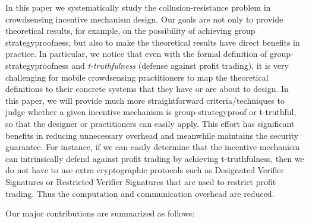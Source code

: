 \documentclass[conference]{IEEEtran}
\theoremstyle{definition}
\begin{document}

In this paper we systematically study the collusion-resistance problem in crowdsensing incentive mechanism design. Our goals are not only to provide theoretical results, for example, on the possibility of achieving group strategyproofness, but also to make the theoretical results have direct benefits in practice. In particular, we notice that even with the formal definition of group-strategyproofness and \textit{t-truthfulness} (defense against profit trading), it is very challenging for mobile crowdsensing practitioners to map the theoretical definitions to their concrete systems that they have or are about to design. In this paper, we will provide much more straightforward criteria/techniques to judge whether a given incentive mechanism is group-strategyproof or t-truthful, so that the designer or practitioners can easily apply. This effort has significant benefits in reducing unnecessary overhead and meanwhile maintains the security guarantee. For instance, if we can easily determine that the incentive mechanism can intrinsically defend against profit trading by achieving t-truthfulness, then we do not have to use extra cryptographic protocols such as Designated Verifier Signatures \cite{jakobsson1996designated} or Restricted Verifier Signatures \cite{zhong2007designing} that are used to restrict profit trading. Thus the computation and communication overhead are reduced.



Our major contributions are summarized as follows:
\end{document}
